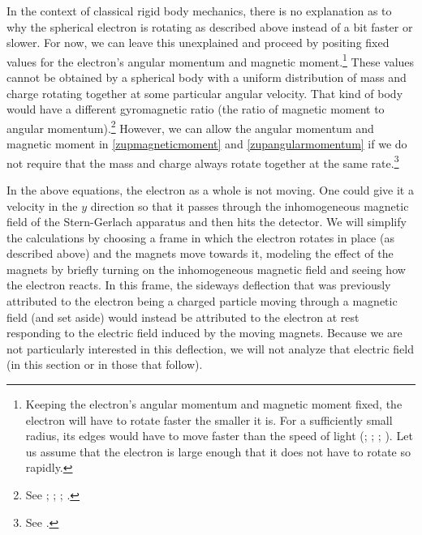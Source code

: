 \documentclass[12pt,secnumarabic,amsmath,amssymb,balancelastpage,nofootinbib]{article}
\begin{document}
In the context of classical rigid body mechanics, there is no explanation as to why the spherical electron is rotating as described above instead of a bit faster or slower.  For now, we can leave this unexplained and proceed by positing fixed values for the electron's angular momentum and magnetic moment.\footnote{Keeping the electron's angular momentum and magnetic moment fixed, the electron will have to rotate faster the smaller it is.  For a sufficiently small radius, its edges would have to move faster than the speed of light (\citealp[pg.\ 35]{tomonaga1997}; \citealp[problem 4.25]{griffithsQM}; \citealp[pg.\ 127]{rohrlich}; \citealp{howelectronsspin}).  Let us assume that the electron is large enough that it does not have to rotate so rapidly.}  These values cannot be obtained by a spherical body with a uniform distribution of mass and charge rotating together at some particular angular velocity.  That kind of body would have a different gyromagnetic ratio (the ratio of magnetic moment to angular momentum).\footnote{See \citet[pg.\ 47]{uhlenbeck}; \citet[pg.\ 39]{pais1989}; \citet[pg.\ 187]{jackson}; \citet[problem 5.58]{griffiths}.}  However, we can allow the angular momentum and magnetic moment in \eqref{zupmagneticmoment} and \eqref{zupangularmomentum} if we do not require that the mass and charge always rotate together at the same rate.\footnote{See \citet{howelectronsspin}.}

In the above equations, the electron as a whole is not moving.  One could give it a velocity in the $y$ direction so that it passes through the inhomogeneous magnetic field of the Stern-Gerlach apparatus and then hits the detector.  We will simplify the calculations by choosing a frame in which the electron rotates in place (as described above) and the magnets move towards it, modeling the effect of the magnets by briefly turning on the inhomogeneous magnetic field and seeing how the electron reacts.  In this frame, the sideways deflection that was previously attributed to the electron being a charged particle moving through a magnetic field (and set aside) would instead be attributed to the electron at rest responding to the electric field induced by the moving magnets.  Because we are not particularly interested in this deflection, we will not analyze that electric field (in this section or in those that follow).
\end{document}
